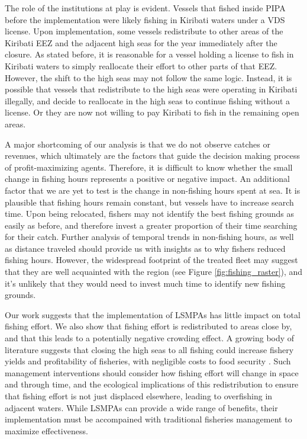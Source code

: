 \documentclass[11pt,english]{article}
\begin{document}
The role of the institutions at play is evident. Vessels that fished
inside PIPA before the implementation were likely fishing in
Kiribati waters under a VDS license. Upon implementation,
some vessels redistribute to other areas of the Kiribati EEZ and the adjacent
high seas for the year immediately after the closure. As stated before,
it is reasonable for a vessel holding a license to fish in Kiribati
waters to simply reallocate their effort to other parts of that EEZ.
However, the shift to the high seas may not follow the same logic.
Instead, it is possible that vessels that redistribute to the high seas
were operating in Kiribati illegally, and decide to reallocate in the
high seas to continue fishing without a license. Or they are now not willing to pay Kiribati to fish in the remaining open areas.

A major shortcoming of our analysis is that we do not observe catches or
revenues, which ultimately are the factors that guide the decision
making process of profit-maximizing agents. Therefore, it is difficult
to know whether the small change in fishing hours represents a positive or
negative impact. An additional factor that we are yet to test is the
change in non-fishing hours spent at sea. It is plausible that fishing
hours remain constant, but vessels have to increase search time. Upon
being relocated, fishers may not identify the best fishing grounds as
easily as before, and therefore invest a greater proportion of their
time searching for their catch. Further analysis of temporal trends in
non-fishing hours, as well as distance traveled should provide us with
insights as to why fishers reduced fishing hours. However, the
widespread footprint of the treated fleet may suggest that they are well
acquainted with the region (see Figure \ref{fig:fishing_raster}), and it's
unlikely that they would need to invest much time to identify new fishing grounds.

Our work suggests that the implementation of LSMPAs has little impact on
total fishing effort. We also show that fishing effort is
redistributed to areas close by, and that this leads to a potentially
negative crowding effect. A growing body of literature suggests that
closing the high seas to all fishing could increase fishery yields and
profitability of fisheries, with negligible costs to food security
\citep{white_2014,sumaila_2015,sala_2018a,schiller_2018}. Such
management interventions should consider how fishing effort will change
in space and through time, and the ecological implications of this
redistribution to ensure that fishing effort is not just displaced
elsewhere, leading to overfishing in adjacent waters. While LSMPAs can
provide a wide range of benefits, their implementation must be
accompained with traditional fisheries management to maximize
effectiveness.
\end{document}
